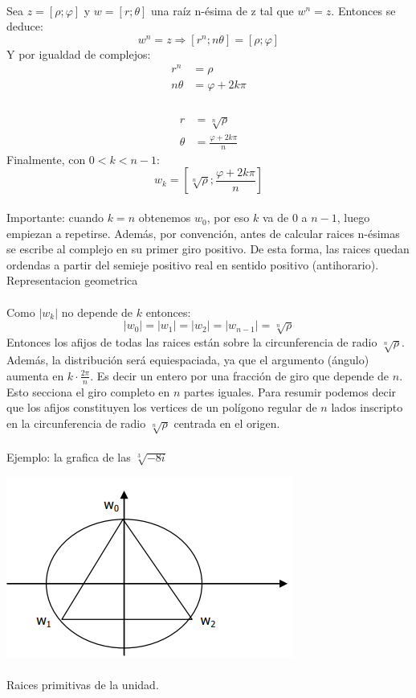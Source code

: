 \documentclass[]{article}
\begin{document}
\\
Sea $ z = [\rho;\varphi]$ y $ w = [r;\theta]$ una raíz n-ésima de z tal que $w^{n} = z$.
Entonces se deduce:
$$
w^{n} = z \Rightarrow [r^{n};n\theta] = [\rho;\varphi]
$$
Y por igualdad de complejos:
\begin{align}
  r^{n} &= \rho\\
  n\theta &= \varphi +2k\pi \\
\end{align}
\\
\begin{align}
  r &= \sqrt[n]{\rho}\\
  \theta &= \frac{\varphi+2k\pi}{n}
\end{align}
Finalmente, con $ 0 < k < n-1$: 
$$
w_k = [\sqrt[n]{\rho};\frac{\varphi+2k\pi}{n}]
$$
\\
Importante: cuando $k=n$ obtenemos $w_0$, por eso  $k$ va de $0$ a $n-1$, luego empiezan a repetirse. Además, por convención, antes de calcular raices n-ésimas se escribe al complejo en su primer giro positivo. De esta forma, las raices quedan ordendas a partir del semieje positivo real en sentido positivo (antihorario).
\\
\large Representacion geometrica
\normalsize
\\
\\
Como $|w_k|$ no depende de $k$ entonces:
$$
|w_0| = |w_1| = |w_2| = |w_{n-1}| = \sqrt[n]{\rho}
$$
Entonces los afijos de todas las raices están sobre la circunferencia de radio $\sqrt[n]{\rho}$.
\\
Además, la distribución será equiespaciada, ya que el argumento (ángulo) aumenta en $k\cdot \frac{2\pi}{n}$. Es decir un entero por una fracción de giro que depende de $n$. Esto secciona el giro completo en $n$ partes iguales.
Para resumir podemos decir que los afijos constituyen los vertices de un polígono regular de $n$ lados inscripto en la circunferencia de radio $\sqrt[n]{\rho}$ centrada en el origen.
\\
\\
Ejemplo: la grafica de las $ \sqrt[3]{-8i}$

\includegraphics{../../../Imagenes/Superior/Complejos/Complejos04.PNG}
\\
\\
\Large Raices primitivas de la unidad.
\normalsize
\\
\end{document}
